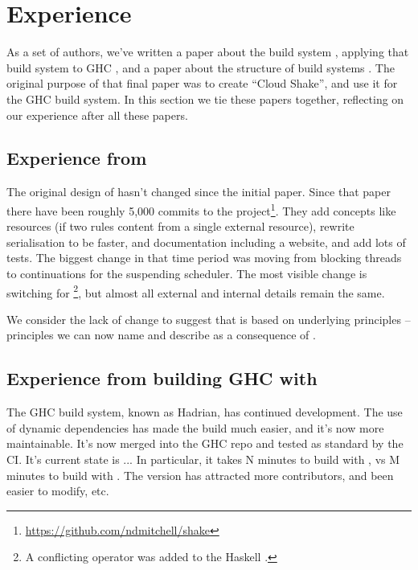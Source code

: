 \section{Experience}\label{sec-experience}

As a set of authors, we've written a paper about the \Shake build system \cite{mitchell2012shake},
applying that build system to GHC \cite{hadrian}, and a paper about the structure of build
systems \cite{mokhov2018buildsystems}. The original purpose of that final paper was to create
``Cloud Shake'', and use it for the GHC build system. In this section we tie these papers together,
reflecting on our experience after all these papers.

\subsection{Experience from \Shake}

The original design of \Shake hasn't changed since the initial paper. Since that paper there have been roughly 5,000 commits to the \Shake project\footnote{\url{https://github.com/ndmitchell/shake}}. They add concepts like resources (if two rules content from a single external resource), rewrite serialisation to be faster, and documentation including a website, and add lots of tests. The biggest change in that time period was moving from blocking threads to continuations for the suspending scheduler. The most visible change is switching \hs{*>} for \hs{\%>}\footnote{A conflicting \hs{*>} operator was added to the Haskell .}, but almost all external and internal details remain the same.

We consider the lack of change to suggest that \Shake is based on underlying principles -- principles we can now name and describe as a consequence of \cite{mokhov2018buildsystems}.

\subsection{Experience from building GHC with \Shake}


The GHC build system, known as Hadrian, has continued development. The use of dynamic dependencies has made the build much easier, and it's now more maintainable. It's now merged into the GHC repo and tested as standard by the CI. It's current state is ... In particular, it takes N minutes to build with \Shake, vs M minutes to build with \Make. The \Shake version has attracted more contributors, and been easier to modify, etc.

